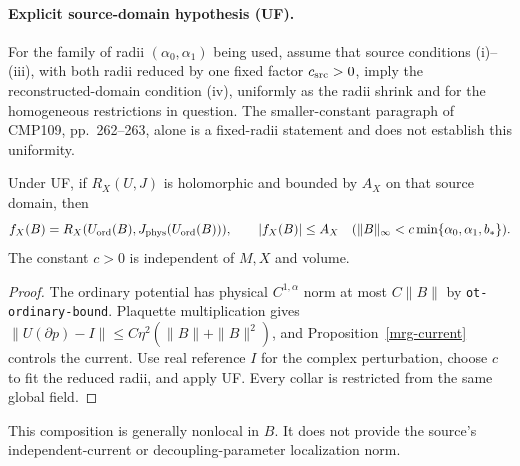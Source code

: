 \paragraph{Explicit source-domain hypothesis (UF).}
For the family of radii $(\alpha_0,\alpha_1)$ being used, assume that
source conditions (i)--(iii), with both radii reduced by one fixed
factor $c_{\rm src}>0$, imply the reconstructed-domain condition (iv),
uniformly as the radii shrink and for the homogeneous restrictions in
question. The smaller-constant paragraph of CMP109, pp.~262--263,
alone is a fixed-radii statement and does not establish this uniformity.

\begin{corollary}
\label{mrg-specialization}
Under UF, if $R_X(U,J)$ is holomorphic and bounded by $A_X$ on that
source domain, then
\begin{equation}
 f_X(B)=R_X(U_{\rm ord}(B),J_{\rm phys}(U_{\rm ord}(B))),\qquad
 |f_X(B)|\le A_X\quad
 (\|B\|_\infty<c\min\{\alpha_0,\alpha_1,b_*\}).
 \label{mrg-source-ball}
\end{equation}
The constant $c>0$ is independent of $M,X$ and volume.
\end{corollary}
\begin{proof}
The ordinary potential has physical $C^{1,\alpha}$ norm at most
$C\|B\|$ by \texttt{ot-ordinary-bound}. Plaquette multiplication gives
$\|U(\partial p)-I\|\le C\eta^2(\|B\|+\|B\|^2)$, and
Proposition~\ref{mrg-current} controls the current. Use real reference
$I$ for the complex perturbation, choose $c$ to fit the reduced radii,
and apply UF. Every collar is restricted from the same global field.
\end{proof}
This composition is generally nonlocal in $B$. It does not provide the
source's independent-current or decoupling-parameter localization norm.

